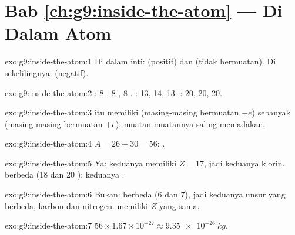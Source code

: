 \section*{Bab \ref{ch:g9:inside-the-atom} --- Di Dalam Atom}

\begin{solution}{exo:g9:inside-the-atom:1}
Di dalam inti:  (positif) dan  (tidak bermuatan). Di
sekelilingnya:  (negatif).
\end{solution}

\begin{solution}{exo:g9:inside-the-atom:2}
: 8 , 8 , 8 .
: 13, 14, 13. : 20, 20, 20.
\end{solution}

\begin{solution}{exo:g9:inside-the-atom:3}
 itu memiliki  (masing-masing bermuatan $-e$) sebanyak
 (masing-masing bermuatan $+e$): muatan-muatannya saling
meniadakan.
\end{solution}

\begin{solution}{exo:g9:inside-the-atom:4}
$A = 26 + 30 = 56$: .
\end{solution}

\begin{solution}{exo:g9:inside-the-atom:5}
Ya: keduanya memiliki $Z = 17$, jadi keduanya klorin. 
berbeda (18 dan 20 ): keduanya .
\end{solution}

\begin{solution}{exo:g9:inside-the-atom:6}
Bukan:  berbeda (6 dan 7), jadi keduanya unsur yang
berbeda, karbon dan nitrogen.  memiliki $Z$ yang sama.
\end{solution}

\begin{solution}{exo:g9:inside-the-atom:7}
$56 \times 1.67 \times 10^{-27} \approx \qty{9.35e-26}{kg}$.
\end{solution}

